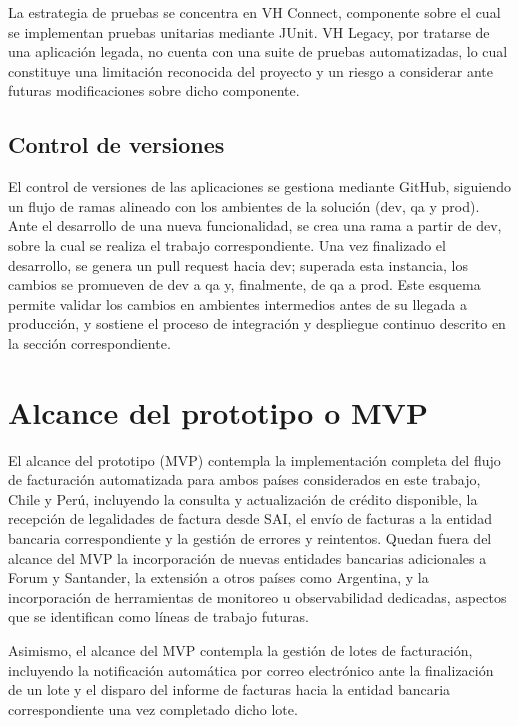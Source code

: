 La estrategia de pruebas se concentra en VH Connect, componente sobre el cual se implementan pruebas unitarias mediante JUnit. VH Legacy, por tratarse de una aplicación legada, no cuenta con una suite de pruebas automatizadas, lo cual constituye una limitación reconocida del proyecto y un riesgo a considerar ante futuras modificaciones sobre dicho componente.

\subsection{Control de versiones}

El control de versiones de las aplicaciones se gestiona mediante GitHub, siguiendo un flujo de ramas alineado con los ambientes de la solución (dev, qa y prod). Ante el desarrollo de una nueva funcionalidad, se crea una rama a partir de dev, sobre la cual se realiza el trabajo correspondiente. Una vez finalizado el desarrollo, se genera un pull request hacia dev; superada esta instancia, los cambios se promueven de dev a qa y, finalmente, de qa a prod. Este esquema permite validar los cambios en ambientes intermedios antes de su llegada a producción, y sostiene el proceso de integración y despliegue continuo descrito en la sección correspondiente.

\section{Alcance del prototipo o MVP}

El alcance del prototipo (MVP) contempla la implementación completa del flujo de facturación automatizada para ambos países considerados en este trabajo, Chile y Perú, incluyendo la consulta y actualización de crédito disponible, la recepción de legalidades de factura desde SAI, el envío de facturas a la entidad bancaria correspondiente y la gestión de errores y reintentos. Quedan fuera del alcance del MVP la incorporación de nuevas entidades bancarias adicionales a Forum y Santander, la extensión a otros países como Argentina, y la incorporación de herramientas de monitoreo u observabilidad dedicadas, aspectos que se identifican como líneas de trabajo futuras.

Asimismo, el alcance del MVP contempla la gestión de lotes de facturación, incluyendo la notificación automática por correo electrónico ante la finalización de un lote y el disparo del informe de facturas hacia la entidad bancaria correspondiente una vez completado dicho lote.

